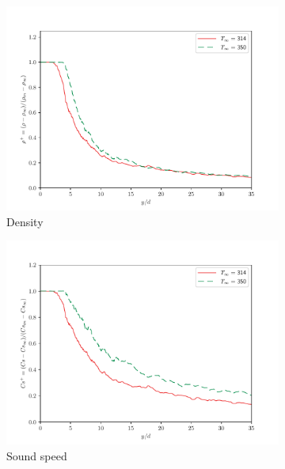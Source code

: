 \begin{figure}[H]
\begin{center}
\begin{subfigure}{0.45\textwidth}
\centering
	\includegraphics[scale=.35]{figures/Plots/centerline/rho_centerline_scaled.pdf}
	\caption{Density} \label{noniso_rho_centerline_1}
\end{subfigure}
\begin{subfigure}{0.45\textwidth}
\centering
	\includegraphics[scale=.35]{figures/Plots/centerline/Cs_centerline_scaled.pdf}
	\caption{Sound speed} \label{noniso_Cs_centerline_1}
\end{subfigure}
\vfill
\begin{subfigure}{0.45\textwidth}
\centering

\end{subfigure}
\end{center}
\end{figure}
